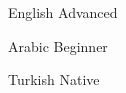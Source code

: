 
\begin{cvskills}

  \cvskill
    {English} %
    {Advanced} %

  \cvskill
    {Arabic} %
    {Beginner} %

  \cvskill
    {Turkish} %
    {Native} %

\end{cvskills}
